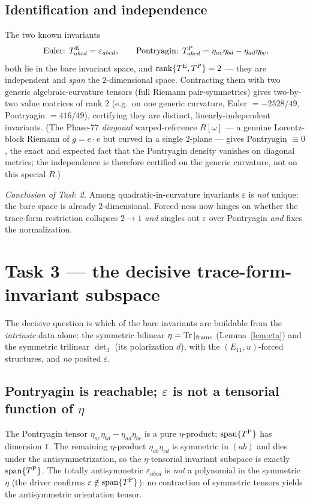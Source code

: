 \documentclass[11pt]{article}
\newcommand{\eu}{e}
\newcommand{\om}{\omega}
\newcommand{\Tr}{\operatorname{Tr}}
\theoremstyle{definition}\newtheorem{remark}{Remark}
\theoremstyle{definition}\newtheorem{definition}{Definition}
\theoremstyle{plain}\newtheorem{proposition}{Proposition}
\theoremstyle{plain}\newtheorem{lemma}{Lemma}
\begin{document}
\subsection{Identification and independence}
The two known invariants
\begin{equation}
  \text{Euler: } T^{\rm E}_{abcd}=\varepsilon_{abcd},\qquad
  \text{Pontryagin: } T^{\rm P}_{abcd}=\eta_{ac}\eta_{bd}-\eta_{ad}\eta_{bc},
\end{equation}
both lie in the bare invariant space, and $\operatorname{rank}\{T^{\rm E},T^{\rm
P}\}=2$ --- they are independent and \emph{span} the $2$-dimensional space.
Contracting them with two generic algebraic-curvature tensors (full Riemann
pair-symmetries) gives two-by-two value matrices of rank $2$ (e.g.\ on one generic
curvature, Euler $=-2528/49$, Pontryagin $=416/49$), certifying they are distinct,
linearly-independent invariants. (The Phase-77 \emph{diagonal} warped-reference
$R[\om]$ --- a genuine Lorentz-block Riemann of $g=\eu\cdot\eu$ but curved in a single
$2$-plane --- gives Pontryagin $\equiv0$, the exact and expected fact that the
Pontryagin density vanishes on diagonal metrics; the independence is therefore
certified on the generic curvature, not on this special $R$.)

\medskip\noindent\emph{Conclusion of Task~2.} Among quadratic-in-curvature
invariants $\varepsilon$ is \emph{not} unique: the bare space is already
$2$-dimensional. Forced-ness now hinges on whether the trace-form restriction
collapses $2\to1$ \emph{and} singles out $\varepsilon$ over Pontryagin \emph{and}
fixes the normalization.

\section{Task 3 --- the decisive trace-form-invariant subspace}
The decisive question is which of the bare invariants are buildable from the
\emph{intrinsic} data alone: the symmetric bilinear $\eta=\Tr|_{\rm frame}$
(Lemma~\ref{lem:eta}) and the symmetric trilinear $\det\nolimits_3$ (its polarization
$d$), with the $(E_{11},u)$-forced structures, and \emph{no} posited $\varepsilon$.

\subsection{Pontryagin is reachable; $\varepsilon$ is not a tensorial function of $\eta$}
The Pontryagin tensor $\eta_{ac}\eta_{bd}-\eta_{ad}\eta_{bc}$ is a pure $\eta$-product;
$\mathrm{span}\{T^{\rm P}\}$ has dimension $1$. The remaining $\eta$-product
$\eta_{ab}\eta_{cd}$ is symmetric in $(ab)$ and dies under the antisymmetrization, so
the $\eta$-tensorial invariant subspace is exactly $\mathrm{span}\{T^{\rm P}\}$. The
totally antisymmetric $\varepsilon_{abcd}$ is \emph{not} a polynomial in the symmetric
$\eta$ (the driver confirms $\varepsilon\notin\mathrm{span}\{T^{\rm P}\}$): no
contraction of symmetric tensors yields the antisymmetric orientation tensor.
\end{document}
